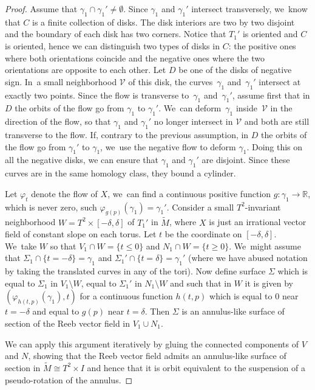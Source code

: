 \begin{proof}
Assume that $\gamma_1\cap \gamma_1' \neq \emptyset$. Since $\gamma_1$ and $\gamma_1'$ intersect transversely, we~know that $C$ is a finite collection of disks. The disk interiors are two by two disjoint and the boundary of each disk has two corners. Notice that $T_1'$ is oriented and $C$ is oriented, hence we can distinguish two types of disks in $C$: the positive ones where both orientations coincide and the negative ones where the two orientations are opposite to each other.
Let $D$ be one of the disks of negative sign. In~a small neighborhood $\mathcal{V}$ of this disk, the curves~$\gamma_1$ and~$\gamma_1'$ intersect at exactly two points. Since the flow is transverse to~$\gamma_1$ and~$\gamma_1'$, assume first that in $D$ the orbits of the flow go from $\gamma_1$ to $\gamma_1'$. We~can deform~$\gamma_1$ inside~$\mathcal{V}$ in the direction of the flow, so that $\gamma_1$ and $\gamma_1'$ no longer intersect in $\mathcal{V}$ and both are still transverse to the flow. If, contrary to the previous assumption, in $D$ the orbits of the flow go from $\gamma_1'$ to $\gamma_1$, we~use the negative flow to deform $\gamma_1$. Doing this on all the negative disks,
we can ensure that $\gamma_1$ and $\gamma_1'$ are disjoint. Since these curves are in the same homology class, they bound a cylinder.

Let $\varphi_t$ denote the flow of $X$, we~can find a continuous positive function $g: \gamma_1 \to \mathbb{R}$, which is never zero, such $\varphi_{g(p)}(\gamma_1)=\gamma_1'$. Consider a small $T^2$-invariant neighborhood $W=T^2\times [-\delta,\delta]$ of $T_1'$ in $\widetilde M$, where $X$ is just an irrational vector field of constant slope on each torus. Let $t$ be the coordinate on $[-\delta, \delta]$. We~take $W$ so that $V_1\cap W= \{t\leq 0\}$ and $N_1\cap W=\{t\geq 0\}$. We~might assume that $\Sigma_1\cap \{t=-\delta\}=\gamma_1$ and $\Sigma_1'\cap \{t=\delta\}=\gamma_1'$ (where we have abused notation by taking the translated curves in any of the tori). Now define surface $\Sigma$ which is equal to $\Sigma_1$ in $V_1\setminus W$, equal to $\Sigma_1'$ in $N_1\setminus W$ and such that in $W$ it is given by $(\varphi_{h(t,p)}(\gamma_1),t)$ for a continuous function $h(t,p)$ which is equal to $0$ near $t=-\delta$ and equal to $g(p)$ near $t=\delta$. Then $\Sigma$ is an annulus-like surface of section of the Reeb vector field in $V_1\cup N_1$.

We can apply this argument iteratively by gluing the connected components of $V$ and $N$, showing that the Reeb vector field admits an annulus-like surface of section in $\widetilde{M} \cong T^2\times I$ and hence that it is orbit equivalent to the suspension of a pseudo-rotation of the annulus.
\end{proof}

